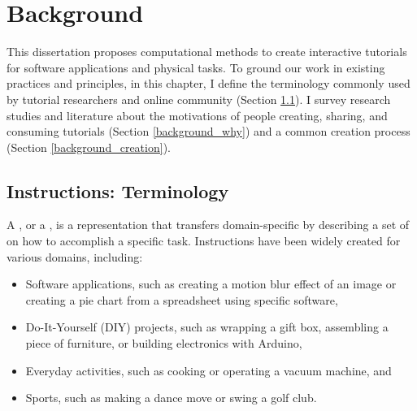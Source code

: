 
\chapter{Background}
\label{chapter_background}

This dissertation proposes computational methods to create interactive tutorials for software applications and physical tasks. To ground our work in existing practices and principles, in this chapter, I define the terminology commonly used by tutorial researchers and online community (Section \ref{background_terms}).
%
I survey research studies and literature about the motivations of people creating, sharing, and consuming tutorials (Section \ref{background_why}) and a common creation process (Section \ref{background_creation}).


\section{Instructions: Terminology}
\label{background_terms}

A , or a , is a representation that transfers domain-specific  by describing a set of  on how to accomplish a specific task. Instructions have been widely created for various domains, including:

\begin{itemize}
  \itemsep -2pt
  \item Software applications, such as creating a motion blur effect of an image or creating a pie chart from a spreadsheet using specific software,
  \item Do-It-Yourself (DIY) projects, such as wrapping a gift box, assembling a piece of furniture, or building electronics with Arduino,
  \item Everyday activities, such as cooking or operating a vacuum machine, and
  \item Sports, such as making a dance move or swing a golf club.
\end{itemize}

